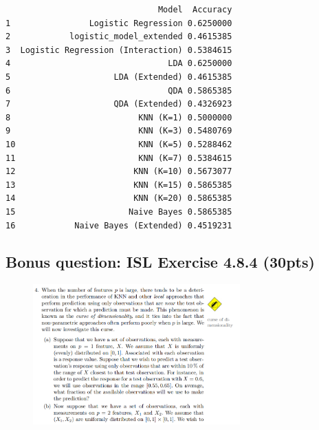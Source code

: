 \documentclass[
]{article}
\begin{document}
\begin{verbatim}
                               Model  Accuracy
1                Logistic Regression 0.6250000
2            logistic_model_extended 0.4615385
3  Logistic Regression (Interaction) 0.5384615
4                                LDA 0.6250000
5                     LDA (Extended) 0.4615385
6                                QDA 0.5865385
7                     QDA (Extended) 0.4326923
8                          KNN (K=1) 0.5000000
9                          KNN (K=3) 0.5480769
10                         KNN (K=5) 0.5288462
11                         KNN (K=7) 0.5384615
12                        KNN (K=10) 0.5673077
13                        KNN (K=15) 0.5865385
14                        KNN (K=20) 0.5865385
15                       Naive Bayes 0.5865385
16            Naive Bayes (Extended) 0.4519231
\end{verbatim}

\hypertarget{bonus-question-isl-exercise-4.8.4-30pts}{%
\subsection{Bonus question: ISL Exercise 4.8.4
(30pts)}\label{bonus-question-isl-exercise-4.8.4-30pts}}

\begin{figure}

{\centering \includegraphics[width=0.71\textwidth,height=\textheight]{images/clipboard-4051626028.png}

}

\end{figure}
\end{document}
